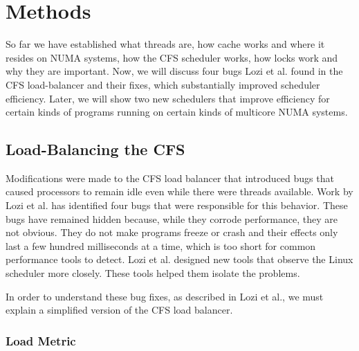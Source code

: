 \documentclass{sig-alternate}
\begin{document}

\section{Methods}
\label{sec:methods}

So far we have established what threads are, how cache works and where it resides on NUMA systems, how the CFS scheduler works, how locks work and why they are important. Now, we will discuss four bugs Lozi et al. found in the CFS load-balancer and their fixes, which substantially improved scheduler efficiency. Later, we will show two new schedulers that improve efficiency for certain kinds of programs running on certain kinds of multicore NUMA systems.

\subsection{Load-Balancing the CFS}
\label{sec:loadbalance}

Modifications were made to the CFS load balancer that introduced bugs that caused processors to remain idle even while there were threads available. Work by Lozi et al. has identified four bugs that were responsible for this behavior. These bugs have remained hidden because, while they corrode performance, they are not obvious. They do not make programs freeze or crash and their effects only last a few hundred milliseconds at a time, which is too short for common performance tools to detect. Lozi et al. designed new tools that observe the Linux scheduler more closely. These tools helped them isolate the problems.~\cite{Lozi:2016}

In order to understand these bug fixes, as described in Lozi et al., we must explain a simplified version of the CFS load balancer.~\cite{Lozi:2016}

\subsubsection{Load Metric}
\label{sec:loadmetric}
\end{document}
